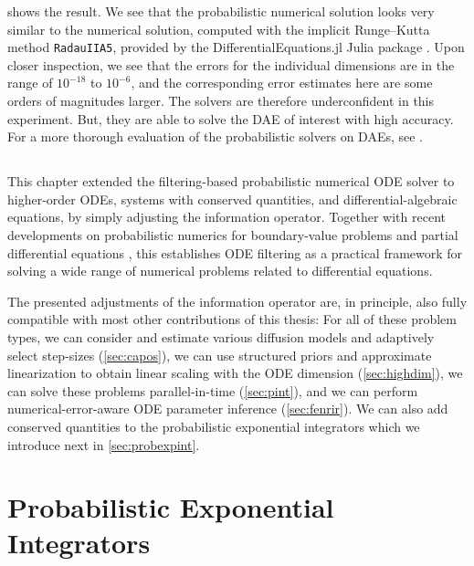 \documentclass{mimosis}
\begin{document}
 shows the result.
We see that the probabilistic numerical solution looks very similar to the numerical solution, computed with the implicit Runge--Kutta method \texttt{RadauIIA5},
provided by the DifferentialEquations.jl Julia package
\parencite{rackauckas2017differentialequations,hairer1987solving}.
Upon closer inspection, we see that the errors for the individual dimensions are in the range of \(10^{-18}\) to \(10^{-6}\),
and the corresponding error estimates here are some orders of magnitudes larger.
The solvers are therefore underconfident in this experiment.
But, they are able to solve the DAE of interest with high accuracy.
For a more thorough evaluation of the probabilistic solvers on DAEs, see
\pickandmix{}.
\section{\wrapupsec{}}
\label{sec:orge792967}
This chapter extended the filtering-based probabilistic numerical ODE solver to higher-order ODEs, systems with conserved quantities, and differential-algebraic equations,
by simply adjusting the information operator.
Together with recent developments on probabilistic numerics for boundary-value problems
\parencite{kraemer202bvp}
and partial differential equations
\parencite{pmlr-v151-kramer22a},
this establishes ODE filtering as a practical framework for solving a wide range of numerical problems related to differential equations.

The presented adjustments of the information operator are, in principle, also fully compatible with most other contributions of this thesis:
For all of these problem types, we can consider and estimate various diffusion models and adaptively select step-sizes (\cref{sec:capos}),
we can use structured priors and approximate linearization to obtain linear scaling with the ODE dimension (\cref{sec:highdim}),
we can solve these problems parallel-in-time (\cref{sec:pint}),
and we can perform numerical-error-aware ODE parameter inference (\cref{sec:fenrir}).
We can also add conserved quantities to the probabilistic exponential integrators which we introduce next in \cref{sec:probexpint}.
\chapter{Probabilistic Exponential Integrators}
\label{sec:org878bf9a}
\label{sec:probexpint}

\end{document}
